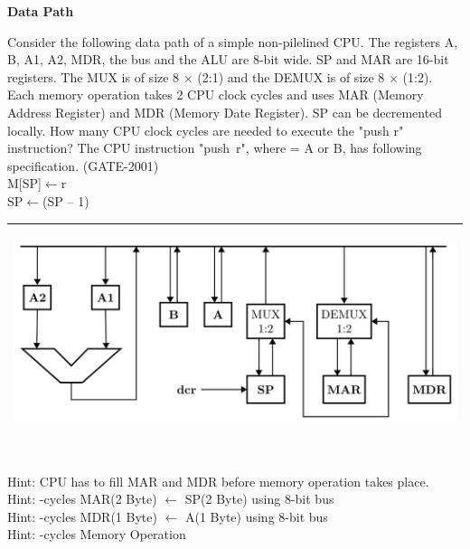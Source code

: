 
\centerline{\textbf{ \LARGE Data Path }}

\begin{questyle}
  \question  Consider the following data path of a simple non-pilelined CPU. The registers A, B, A1, A2, MDR,
             the bus and the ALU are 8-bit wide. SP and MAR are 16-bit registers. The MUX is of
             size 8 × (2:1) and the DEMUX is of size 8 × (1:2). Each memory operation takes 2 CPU
             clock cycles and uses MAR (Memory Address Register) and MDR (Memory Date Register).
             SP can be decremented locally. How many CPU clock cycles are needed to execute the
             "push r" instruction? The CPU instruction \mbox{"push r"}, where = A or B, has
             following specification. (GATE-2001) \\ M[SP]\(\leftarrow\)r \\ SP\(\leftarrow\)(SP – 1)

             \begin{myTableStyle} \begin{tabular}{ |m{14cm}| } \hline
                  \begin{center} \includegraphics[scale=0.3]{./images/data_path_01.png} \end{center}\\ \hline
            \end{tabular} \end{myTableStyle} \vspace{0.08in}

  \begin{oneparchoices}
  \end{oneparchoices}
  \\ Hint: \qquad CPU has to fill MAR and MDR before memory operation takes place.
  \\ Hint: -cycles \qquad \qquad MAR(2 Byte) \(\leftarrow\) SP(2 Byte) \quad using 8-bit bus
  \\ Hint: -cycles \qquad \qquad MDR(1 Byte) \(\leftarrow\) A(1 Byte) \quad using 8-bit bus
  \\ Hint: -cycles \qquad \qquad Memory Operation
\end{questyle}


